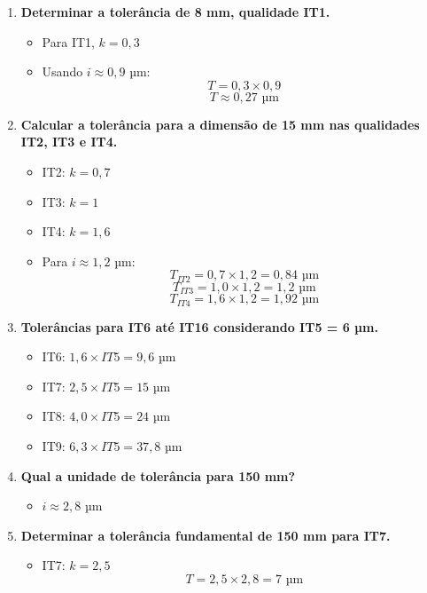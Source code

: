 \begin{enumerate}
    \item \textbf{Determinar a tolerância de 8 mm, qualidade IT1.}
    \begin{itemize}
        \item Para IT1, \( k = 0,3 \)
        \item Usando \( i \approx 0,9 \) µm:
        \[
            T = 0,3 \times 0,9
        \]
        \[
            T \approx 0,27 \text{ µm}
        \]
    \end{itemize}

    \item \textbf{Calcular a tolerância para a dimensão de 15 mm nas qualidades IT2, IT3 e IT4.}
    \begin{itemize}
        \item IT2: \( k = 0,7 \)
        \item IT3: \( k = 1 \)
        \item IT4: \( k = 1,6 \)
        \item Para \( i \approx 1,2 \) µm:
        \[
            T_{IT2} = 0,7 \times 1,2 = 0,84 \text{ µm}
        \]
        \[
            T_{IT3} = 1,0 \times 1,2 = 1,2 \text{ µm}
        \]
        \[
            T_{IT4} = 1,6 \times 1,2 = 1,92 \text{ µm}
        \]
    \end{itemize}

    \item \textbf{Tolerâncias para IT6 até IT16 considerando IT5 = 6 µm.}
    \begin{itemize}
        \item IT6: \( 1,6 \times IT5 = 9,6 \) µm
        \item IT7: \( 2,5 \times IT5 = 15 \) µm
        \item IT8: \( 4,0 \times IT5 = 24 \) µm
        \item IT9: \( 6,3 \times IT5 = 37,8 \) µm
    \end{itemize}

    \item \textbf{Qual a unidade de tolerância para 150 mm?}
    \begin{itemize}
        \item \( i \approx 2,8 \) µm
    \end{itemize}

    \item \textbf{Determinar a tolerância fundamental de 150 mm para IT7.}
    \begin{itemize}
        \item IT7: \( k = 2,5 \)
        \[
            T = 2,5 \times 2,8 = 7 \text{ µm}
        \]
    \end{itemize}


\end{enumerate}
